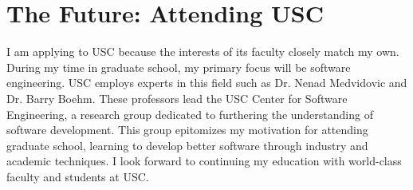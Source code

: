 \section*{The Future: Attending USC}
I am applying to USC because the interests of its faculty closely match my own. During my time in graduate school, my primary focus will be software engineering. USC employs experts in this field such as Dr. Nenad Medvidovic and Dr. Barry Boehm. These professors lead the USC Center for Software Engineering, a research group dedicated to furthering the understanding of software development. This group epitomizes my motivation for attending graduate school, learning to develop better software through industry and academic techniques. I look forward to continuing my education with world-class faculty and students at USC.
